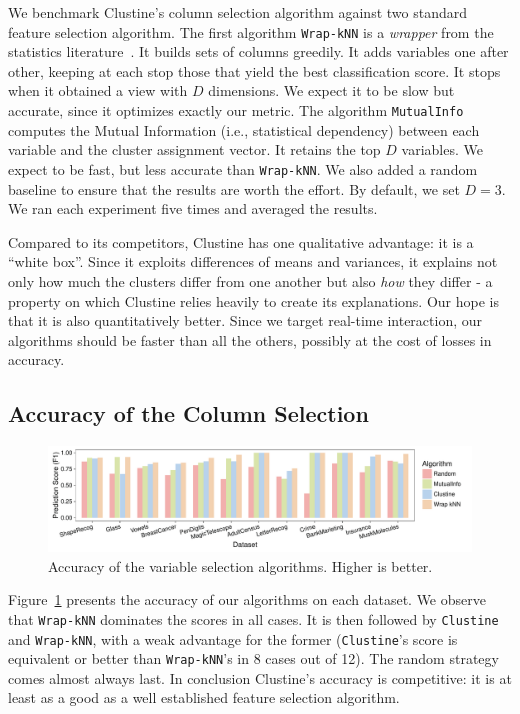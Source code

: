 We benchmark Clustine's column selection algorithm against two standard feature
selection algorithm.  The first algorithm \texttt{Wrap-kNN} is a \emph{wrapper}
from the statistics literature~\cite{guyon2003introduction}. It builds sets of
columns greedily. It adds variables one after other, keeping at each stop those
that yield the best classification score. It stops when it obtained a view with
$D$ dimensions. We expect it to be slow but accurate, since it optimizes
exactly our metric. The algorithm \texttt{MutualInfo} computes the Mutual
Information (i.e., statistical dependency) between each variable and the
cluster assignment vector. It retains the top $D$ variables. We expect to be
fast, but less accurate than \texttt{Wrap-kNN}. We also added a random baseline
to ensure that the results are worth the effort.  By default, we set $D=3$. We
ran each experiment five times and averaged the results.

Compared to its competitors, Clustine has one qualitative advantage: it is a
``white box''. Since it exploits differences of means and variances, it
explains not only how much the clusters differ from one another but also
\emph{how} they differ - a property on which Clustine relies heavily to create
its explanations. Our hope is that it is also quantitatively better. Since we
target real-time interaction, our algorithms should be faster than all the
others, possibly at the cost of losses in accuracy.

\subsection{Accuracy of the Column Selection}
\label{sec:accuracy}
\begin{figure}[t]
  \centering
  \includegraphics[width=\textwidth]{Experiments/F1_Scores}
  \caption{Accuracy of the variable selection algorithms. Higher is better.}\label{pic:accuracy}
\end{figure}

Figure~\ref{pic:accuracy} presents the accuracy of our algorithms on each
dataset. We observe that \texttt{Wrap-kNN} dominates the scores in all cases.
It is then followed by \texttt{Clustine} and \texttt{Wrap-kNN}, with a weak
advantage for the former (\texttt{Clustine}'s score is equivalent or better
than \texttt{Wrap-kNN}'s in 8 cases out of 12). The random strategy comes
almost always last. In conclusion Clustine's accuracy is competitive: it is at
least as a good as a well established feature selection algorithm.

